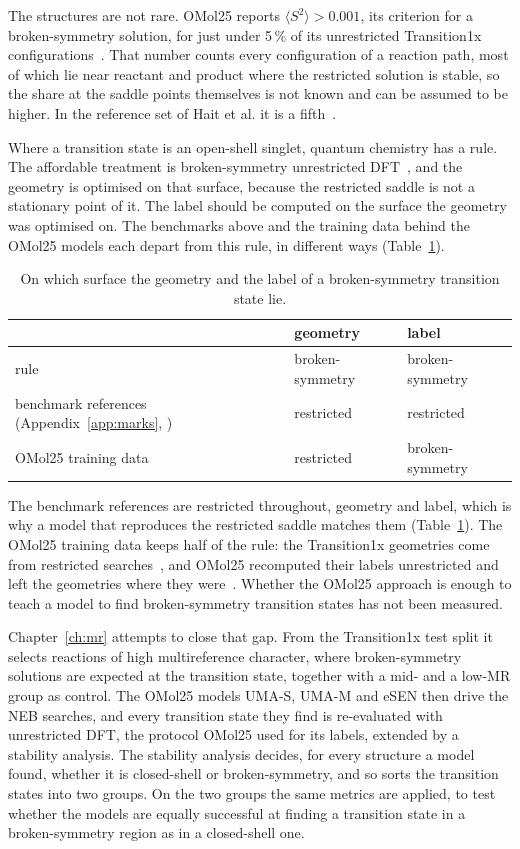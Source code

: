 The structures are not rare. OMol25 reports $\langle S^2 \rangle >
0.001$, its criterion for a broken-symmetry solution, for just under 5\,\% of
its unrestricted Transition1x configurations~\cite{omol25}. That number counts every configuration of
a reaction path, most of which lie near reactant and product where the
restricted solution is stable, so the share at the saddle points
themselves is not known and can be assumed to be higher. In the
reference set of Hait et al. it is a fifth~\cite{hait2025}.

Where a transition state is an open-shell singlet, quantum chemistry
has a rule. The affordable treatment is broken-symmetry unrestricted
DFT~\cite{grafenstein2002, crawford2001}, and the geometry is optimised
on that surface, because the restricted saddle is not a stationary
point of it. The label should be computed on the surface the
geometry was optimised on. The
benchmarks above and the training data behind the OMol25 models each
depart from this rule, in different ways (Table~\ref{tab:surfaces}).

\begin{table}[h]
\centering
\small
\caption{On which surface the geometry and the label of a
broken-symmetry transition state lie.}
\label{tab:surfaces}
\begin{tabular}{@{}lll@{}}
\toprule
 & geometry & label \\
\midrule
rule & broken-symmetry & broken-symmetry \\
benchmark references (Appendix~\ref{app:marks}, \cite{marks2026}) & restricted & restricted \\
OMol25 training data~\cite{omol25} & restricted & broken-symmetry \\
\bottomrule
\end{tabular}
\end{table}

The benchmark references are restricted throughout, geometry and label,
which is why a model that reproduces the restricted saddle matches them
(Table~\ref{tab:surfaces}).
The OMol25 training data keeps half of the rule: the Transition1x
geometries come from restricted searches~\cite{schreiner2022}, and
OMol25 recomputed their labels unrestricted and left the geometries
where they were~\cite{omol25}.
Whether the OMol25 approach is enough to teach a model to find
broken-symmetry transition states has not been measured.

Chapter~\ref{ch:mr} attempts to close that gap. From the Transition1x
test split it selects reactions of high multireference character,
where broken-symmetry solutions are expected at the transition state,
together with a mid- and a low-MR group as control. The OMol25 models
UMA-S, UMA-M and eSEN then drive the NEB searches, and every transition
state they find is re-evaluated with unrestricted DFT, the protocol
OMol25 used for its labels, extended by a stability analysis. The
stability analysis decides, for every structure a model found, whether
it is closed-shell or broken-symmetry, and so sorts the transition
states into two groups. On the two groups the same
metrics are applied, to test whether the models are equally successful
at finding a transition state in a broken-symmetry region as in a
closed-shell one.

